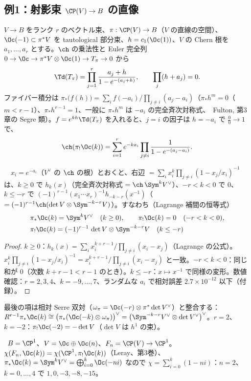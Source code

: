 \subsection{例1：射影束 $\CP(V)\to B$ の直像}
$V\to B$ をランク $r$ のベクトル束、$\pi:\CP(V)\to B$（$V$ の直線の空間）、$\Oc(-1)\subset\pi^*V$ を tautological 部分束、$h=c_1(\Oc(1))$、$V$ の Chern 根を $a_1,\dots,a_r$ とする。$\ch$ の乗法性と Euler 完全列 $0\to\Oc\to\pi^*V\otimes\Oc(1)\to T_\pi\to0$ から
\[
\Td(T_\pi)=\prod_{j=1}^r\frac{a_j+h}{1-e^{-(a_j+h)}},\qquad\prod_j(h+a_j)=0.
\]
ファイバー積分は $\pi_*\bigl(f(h)\bigr)=\sum_i f(-a_i)\Big/\prod_{j\ne i}(a_j-a_i)$（$\pi_*h^m=0$（$m<r-1$）、$\pi_*h^{r-1}=1$、一般に $\pi_*h^m$ は $-a_i$ の完全斉次対称式、\tC\ Fulton, 第3章の Segre 類）。$f=e^{kh}\Td(T_\pi)$ を入れると、$j=i$ の因子は $h=-a_i$ で $\frac00\to1$ で、
\[
\ch(\pi_!\Oc(k))=\sum_{i=1}^re^{-ka_i}\prod_{j\ne i}\frac1{1-e^{-(a_j-a_i)}}.
\]
\begin{prop}\label{prop:Pbundle}\tP\ \tC\
$x_i=e^{-a_i}$（$V^\vee$ の $\ch$ の根）とおくと、右辺 $=\sum_ix_i^k\prod_{j\ne i}(1-x_j/x_i)^{-1}$ は、$k\ge0$ で $h_k(x)$（完全斉次対称式 $=\ch\,\Sym^kV^\vee$）、$-r<k<0$ で $0$、$k\le-r$ で $(-1)^{r-1}(x_1\cdots x_r)^{-1}h_{-k-r}(x^{-1})$（$=(-1)^{r-1}\ch(\det V\otimes\Sym^{-k-r}V)$）。すなわち（Lagrange 補間の恒等式）
\[
\begin{aligned}
&\pi_*\Oc(k)=\Sym^kV^\vee\quad(k\ge0),\qquad\pi_!\Oc(k)=0\quad(-r<k<0),\\
&\pi_!\Oc(k)=(-1)^{r-1}\,\det V\otimes\Sym^{-k-r}V\quad(k\le-r)
\end{aligned}
\]
\end{prop}
\begin{proof}
$k\ge0$：$h_k(x)=\sum_ix_i^{k+r-1}/\prod_{j\ne i}(x_i-x_j)$（Lagrange の公式）。$x_i^k\prod_{j\ne i}(1-x_j/x_i)^{-1}=x_i^{k+r-1}/\prod_{j\ne i}(x_i-x_j)$ と一致。$-r<k<0$：同じ和が $0$（次数 $k+r-1<r-1$ のとき）。$k\le-r$：$x\mapsto x^{-1}$ で同様の変形。数値確認：$r=2,3,4$、$k=-9,\dots,7$、ランダムな $a_i$ で相対誤差 $2.7\times10^{-12}$ 以下（付録）。
\end{proof}
最後の項は相対 Serre 双対（$\omega_\pi=\Oc(-r)\otimes\pi^*\det V^\vee$）と整合する：$R^{r-1}\pi_*\Oc(k)\cong\bigl(\pi_*(\Oc(-k)\otimes\omega_\pi)\bigr)^\vee=\bigl(\Sym^{-k-r}V^\vee\otimes\det V^\vee\bigr)^\vee$。$r=2$、$k=-2$：$\pi_!\Oc(-2)=-\det V$（$\det V$ は $h^1$ の束）。
\begin{ex}[Hirzebruch 曲面]\label{ex:Hirz}\tP\
$B=\CP^1$、$V=\Oc\oplus\Oc(n)$、$F_n=\CP(V)\to\CP^1$。$\chi(F_n,\Oc(k))=\chi(\CP^1,\pi_!\Oc(k))$（Leray、第3巻）、$\pi_*\Oc(k)=\Sym^kV^\vee=\bigoplus_{i=0}^k\Oc(-ni)$ なので $\chi=\sum_{i=0}^k(1-ni)$：$n=2$、$k=0,\dots,4$ で $1,0,-3,-8,-15$。
\end{ex}

